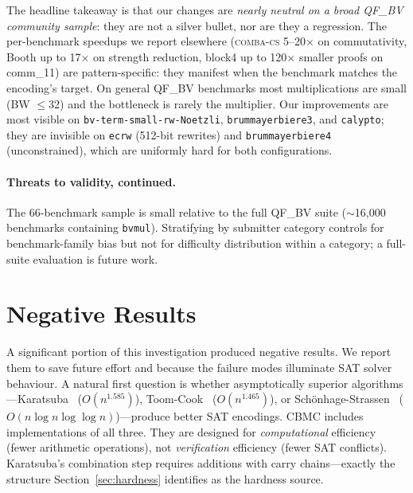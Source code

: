 \documentclass[a4paper]{ceurart}
\newcommand{\combacs}{\textsc{comba-cs}\xspace}
\newcommand{\cbmc}{\textsc{CBMC}\xspace}
\begin{document}
The headline takeaway is that our changes are \emph{nearly neutral
on a broad QF\_BV community sample}: they are not a silver bullet,
nor are they a regression. The per-benchmark speedups we report
elsewhere (\combacs 5--20$\times$ on commutativity, Booth up to
17$\times$ on strength reduction, block4 up to 120$\times$ smaller
proofs on comm\_11) are pattern-specific: they manifest when the
benchmark matches the encoding's target. On general QF\_BV
benchmarks most multiplications are small (BW ${\leq}$32) and the
bottleneck is rarely the multiplier. Our improvements are most
visible on \texttt{bv-term-small-rw-Noetzli}, \texttt{brummayerbiere3},
and \texttt{calypto}; they are invisible on \texttt{ecrw} (512-bit
rewrites) and \texttt{brummayerbiere4} (unconstrained), which are
uniformly hard for both configurations.

\paragraph{Threats to validity, continued.}
The 66-benchmark sample is small relative to the full QF\_BV suite
(${\sim}$16{,}000 benchmarks containing \texttt{bvmul}). Stratifying
by submitter category controls for benchmark-family bias but not
for difficulty distribution within a category; a full-suite
evaluation is future work.

\section{Negative Results}
\label{sec:negative}

A significant portion of this investigation produced negative results.
We report them to save future effort and because the failure modes
illuminate SAT solver behaviour. A natural first question is whether
asymptotically superior algorithms---Karatsuba~\cite{karatsuba1962multiplication}
($O(n^{1.585})$), Toom-Cook~\cite{toom1963complexity} ($O(n^{1.465})$),
or Sch\"onhage-Strassen~\cite{schonhage1971schnelle}
($O(n \log n \log \log n)$)---produce better SAT encodings.
\cbmc includes implementations of all three. They are designed for
\emph{computational} efficiency (fewer arithmetic operations), not
\emph{verification} efficiency (fewer SAT conflicts). Karatsuba's
combination step requires additions with carry chains---exactly the
structure Section~\ref{sec:hardness} identifies as the hardness source.
\end{document}
